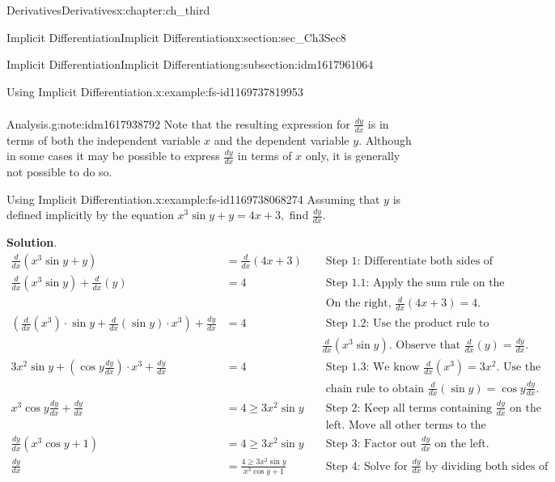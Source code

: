 \documentclass[oneside,10pt,]{book}
\newcommand{\blocktitlefont}{\relax}
\numberwithin{equation}{section}
\newcommand{\amp}{&}
\begin{document}
\begin{chapterptx}{Derivatives}{}{Derivatives}{}{}{x:chapter:ch_third}
\begin{sectionptx}{Implicit Differentiation}{}{Implicit Differentiation}{}{}{x:section:sec_Ch3Sec8}
\begin{subsectionptx}{Implicit Differentiation}{}{Implicit Differentiation}{}{}{g:subsection:idm1617961064}
\begin{example}{Using Implicit Differentiation.}{x:example:fs-id1169737819953}
\begin{align*}
\end{align*}
\begin{note}{Analysis.}{g:note:idm1617938792}%
Note that the resulting expression for \(\frac{dy}{dx}\) is in terms of both the independent variable \(x\) and the dependent variable \(y.\) Although in some cases it may be possible to express \(\frac{dy}{dx}\) in terms of \(x\) only, it is generally not possible to do so.%
\end{note}
\end{example}
\begin{example}{Using Implicit Differentiation.}{x:example:fs-id1169738068274}%
Assuming that \(y\) is defined implicitly by the equation \(x^3 \sin y+y=4x+3,\) find \(\frac{dy}{dx}.\)%
\par\smallskip%
\noindent\textbf{\blocktitlefont Solution}.\hypertarget{g:solution:idm1617929704}{}\quad{}%
\begin{align*}
\frac{d}{dx}(x^3\sin y+y)\amp=\frac{d}{dx}(4x+3)\amp \amp \text{ Step 1: Differentiate both sides of the equation. }\\
\frac{d}{dx}(x^3\sin y)+\frac{d}{dx}(y)\amp= 4\amp \amp \text{ Step 1.1: Apply the sum rule on the left. }\\
\amp \amp \amp \text{ On the right, } \frac{d}{dx}(4x+3)=4.\\
(\frac{d}{dx}(x^3)\cdot \sin y+\frac{d}{dx}(\sin y)\cdot x^3)+\frac{dy}{dx}\amp= 4\amp \amp \text{ Step 1.2: Use the product rule to find }\\
\amp \amp \amp \frac{d}{dx}(x^3\sin y). \text{ Observe that } \frac{d}{dx}(y)=\frac{dy}{dx}.\\
3x^2\sin y+(\cos  y\frac{dy}{dx})\cdot x^3+\frac{dy}{dx}\amp= 4\amp \amp \text{ Step 1.3: We know } \frac{d}{dx}(x^3)=3x^2. \text{ Use the }\\
\amp \amp \amp \text{ chain rule to obtain } \frac{d}{dx}(\sin y)=\cos  y\frac{dy}{dx}.\\
x^3\cos  y\frac{dy}{dx}+\frac{dy}{dx}\amp = 4\geq 3x^2\sin y \amp \amp \text{ Step 2: Keep all terms containing } \frac{dy}{dx} \text{ on the }\\
\amp \amp \amp \text{ left. Move all other terms to the right. }\\
\frac{dy}{dx}(x^3\cos  y+1)\amp= 4\geq 3x^2\sin y\amp \amp \text{ Step 3: Factor out } \frac{dy}{dx} \text{ on the left. }\\
\frac{dy}{dx}\amp=\frac{4\geq 3x^2\sin y}{x^3\cos  y+1}\amp \amp \text{ Step 4: Solve for } \frac{dy}{dx} \text{ by dividing both sides of }\\

\end{align*}
\end{example}
\end{subsectionptx}
\end{sectionptx}
\end{chapterptx}
\end{document}
